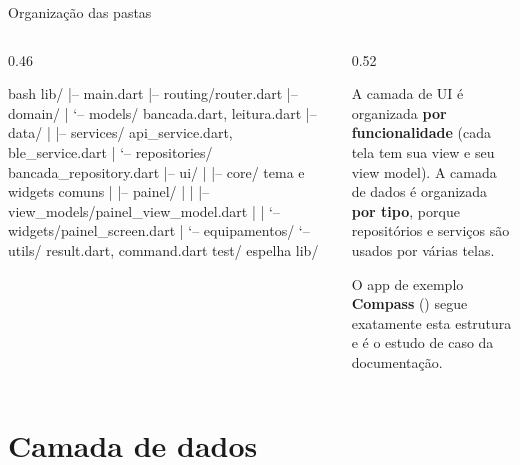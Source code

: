 \documentclass[aspectratio=169,10pt]{beamer}
\begin{document}
\begin{frame}[fragile]{Organização das pastas}
  \begin{columns}[T]
    \begin{column}{0.46\textwidth}
\begin{codigo}[title=lib/,listing options={style=dm,language=bash,basicstyle=\ttfamily\tiny}]{bash}
lib/
|-- main.dart
|-- routing/router.dart
|-- domain/
|   `-- models/        bancada.dart, leitura.dart
|-- data/
|   |-- services/      api_service.dart, ble_service.dart
|   `-- repositories/  bancada_repository.dart
|-- ui/
|   |-- core/          tema e widgets comuns
|   |-- painel/
|   |   |-- view_models/painel_view_model.dart
|   |   `-- widgets/painel_screen.dart
|   `-- equipamentos/
`-- utils/             result.dart, command.dart
test/                  espelha lib/
\end{codigo}
    \end{column}
    \begin{column}{0.52\textwidth}
      \begin{conceito}
        A camada de UI é organizada \textbf{por funcionalidade} (cada tela tem sua view e seu view model). A camada de dados é organizada \textbf{por tipo}, porque repositórios e serviços são usados por várias telas.
      \end{conceito}
      \begin{dica}
        O app de exemplo \textbf{Compass} () segue exatamente esta estrutura e é o estudo de caso da documentação.
      \end{dica}
    \end{column}
  \end{columns}
\end{frame}

\section{Camada de dados}
\end{document}
